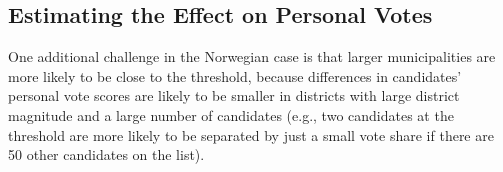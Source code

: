 \documentclass[12pt]{article}
\begin{document}





% 


\clearpage
\subsection{Estimating the Effect on Personal Votes}
\label{app:norway_pv_estimation}

One additional challenge in the Norwegian case is that larger municipalities are more likely to be close to the threshold, because differences in candidates' personal vote scores are likely to be smaller in districts with large district magnitude and a large number of candidates (e.g., two candidates at the threshold are more likely to be separated by just a small vote share if there are 50 other candidates on the list).
\end{document}
